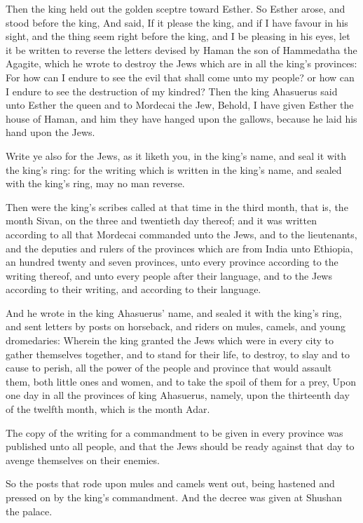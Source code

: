 \verse Then the king held out the golden sceptre toward Esther. So Esther arose, and stood before the king, \verse And said, If it please the king, and if I have favour in his sight, and the thing seem right before the king, and I be pleasing in his eyes, let it be written to reverse the letters devised by Haman the son of Hammedatha the Agagite, which he wrote to destroy the Jews which are in all the king's provinces: \verse For how can I endure to see the evil that shall come unto my people?  or how can I endure to see the destruction of my kindred?  \verse Then the king Ahasuerus said unto Esther the queen and to Mordecai the Jew, Behold, I have given Esther the house of Haman, and him they have hanged upon the gallows, because he laid his hand upon the Jews.

\verse Write ye also for the Jews, as it liketh you, in the king's name, and seal it with the king's ring: for the writing which is written in the king's name, and sealed with the king's ring, may no man reverse.

\verse Then were the king's scribes called at that time in the third month, that is, the month Sivan, on the three and twentieth day thereof; and it was written according to all that Mordecai commanded unto the Jews, and to the lieutenants, and the deputies and rulers of the provinces which are from India unto Ethiopia, an hundred twenty and seven provinces, unto every province according to the writing thereof, and unto every people after their language, and to the Jews according to their writing, and according to their language.

\verse And he wrote in the king Ahasuerus' name, and sealed it with the king's ring, and sent letters by posts on horseback, and riders on mules, camels, and young dromedaries: \verse Wherein the king granted the Jews which were in every city to gather themselves together, and to stand for their life, to destroy, to slay and to cause to perish, all the power of the people and province that would assault them, both little ones and women, and to take the spoil of them for a prey, \verse Upon one day in all the provinces of king Ahasuerus, namely, upon the thirteenth day of the twelfth month, which is the month Adar.

\verse The copy of the writing for a commandment to be given in every province was published unto all people, and that the Jews should be ready against that day to avenge themselves on their enemies.

\verse So the posts that rode upon mules and camels went out, being hastened and pressed on by the king's commandment. And the decree was given at Shushan the palace.

